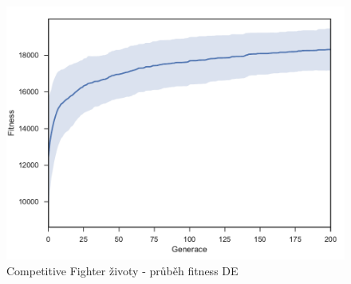 \begin{figure}[p]\centering
	\includegraphics[width=\columnwidth]{../img/CompetitiveMap/FighterKeep}
	\caption{Competitive Fighter životy - průběh fitness DE}
	\label{obr04:CompetitiveFighterKeep}
\end{figure}
\clearpage
